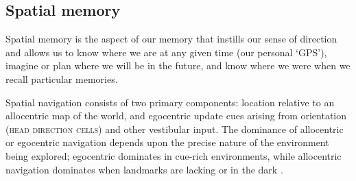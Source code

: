 

\subsection{Spatial memory}\label{sec:intro:memory:spatial}
Spatial memory is the aspect of our memory that instills our sense of direction and allows us to know where we are at any given time (our personal `GPS'), imagine or plan where we will be in the future, and know where we were when we recall particular memories.


Spatial navigation consists of two primary components: location relative to an allocentric map of the world, and egocentric update cues arising from orientation (\textsc{head direction cells}) and other vestibular input.
The dominance of allocentric or egocentric navigation depends upon the precise nature of the environment being explored; egocentric dominates in cue-rich environments, while allocentric navigation dominates when landmarks are lacking or in the dark \citep{Knierim1998}.

